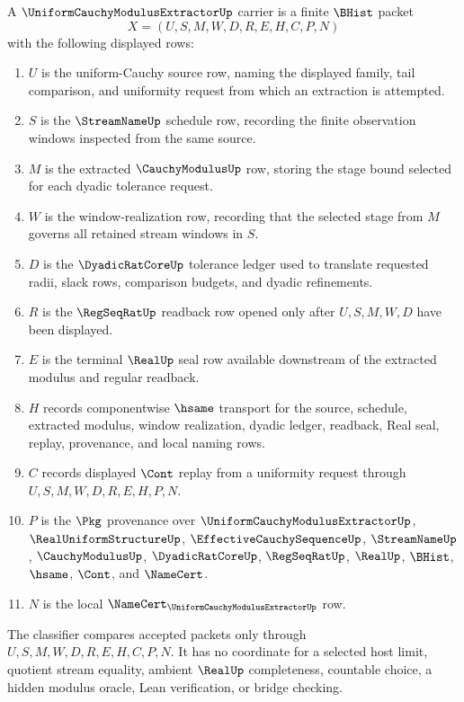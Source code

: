 \begin{definition}
\label{def:uniform-cauchy-modulus-extractor-carrier}
A $\UniformCauchyModulusExtractorUp$ carrier is a finite $\BHist$ packet
$$
X=(U,S,M,W,D,R,E,H,C,P,N)
$$
with the following displayed rows:
\begin{enumerate}
\item $U$ is the uniform-Cauchy source row, naming the displayed family, tail comparison, and uniformity request from which an extraction is attempted.
\item $S$ is the $\StreamNameUp$ schedule row, recording the finite observation windows inspected from the same source.
\item $M$ is the extracted $\CauchyModulusUp$ row, storing the stage bound selected for each dyadic tolerance request.
\item $W$ is the window-realization row, recording that the selected stage from $M$ governs all retained stream windows in $S$.
\item $D$ is the $\DyadicRatCoreUp$ tolerance ledger used to translate requested radii, slack rows, comparison budgets, and dyadic refinements.
\item $R$ is the $\RegSeqRatUp$ readback row opened only after $U,S,M,W,D$ have been displayed.
\item $E$ is the terminal $\RealUp$ seal row available downstream of the extracted modulus and regular readback.
\item $H$ records componentwise $\hsame$ transport for the source, schedule, extracted modulus, window realization, dyadic ledger, readback, Real seal, replay, provenance, and local naming rows.
\item $C$ records displayed $\Cont$ replay from a uniformity request through $U,S,M,W,D,R,E,H,P,N$.
\item $P$ is the $\Pkg$ provenance over $\UniformCauchyModulusExtractorUp$, $\RealUniformStructureUp$, $\EffectiveCauchySequenceUp$, $\StreamNameUp$, $\CauchyModulusUp$, $\DyadicRatCoreUp$, $\RegSeqRatUp$, $\RealUp$, $\BHist$, $\hsame$, $\Cont$, and $\NameCert$.
\item $N$ is the local $\NameCert_{\UniformCauchyModulusExtractorUp}$ row.
\end{enumerate}
The classifier compares accepted packets only through $U,S,M,W,D,R,E,H,C,P,N$. It has no coordinate for a selected host limit, quotient stream equality, ambient $\RealUp$ completeness, countable choice, a hidden modulus oracle, Lean verification, or bridge checking.
\end{definition}


